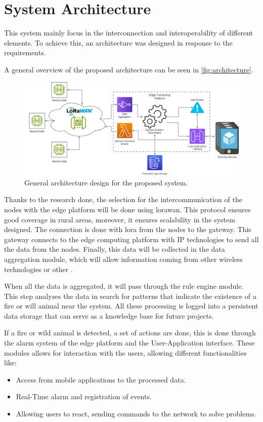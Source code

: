 \section{System Architecture}

This system mainly focus in the interconnection and interoperability of different elements. 
To achieve this, an architecture was designed in response to the requirements.

A general overview of the proposed architecture can be seen in \autoref{fig:architecture}.

\begin{figure}[H]
    \centering
    \includegraphics[width=1\textwidth]{./images/6/generalArchitecture.png}
    \caption{General architecture design for the proposed system.}
    \label{fig:architecture}
\end{figure}

Thanks to the research done, the selection for the intercommunication of the nodes with the edge platform 
will be done using \acrshort{lorawan}. This protocol ensures good coverage in rural areas, moreover, it ensures 
scalability in the system designed. The connection is done with lora from the nodes to the gateway. 
This gateway connects to the edge computing platform with IP technologies to send all the data from the nodes. 
Finally, this data will be collected in the data aggregation module, which will allow information coming from other 
wireless technologies or other .

When all the data is aggregated, it will pass through the rule engine module. This step analyzes the data in search 
for patterns that indicate the existence of a fire or will animal near the system. All these processing is logged into a 
persistent data storage that can serve as a knowledge base for future projects. 

If a fire or wild animal is detected, a set of actions are done, this is done through the alarm system of the edge platform and 
the User-Application interface. These modules allows for interaction with the users, allowing different functionalities like:
\begin{itemize}
    \item Access from mobile applications to the processed data.
    \item Real-Time alarm and registration of events.
    \item Allowing users to react, sending commands to the network to solve problems.
\end{itemize}

